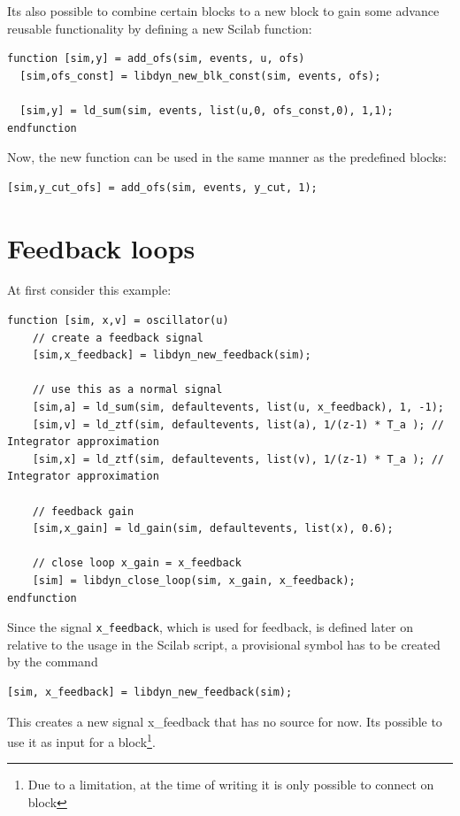 \documentclass[%
	pdftex,%
	a4paper,%
	oneside,%
	11pt,%
	halfparskip,%
	headsepline,%
	bibtotocnumbered,%
	idxtotoc%
]{scrartcl}
\begin{document}
Its also possible to combine certain blocks to a new block to gain some advance reusable functionality by defining a new Scilab function:

\begin{verbatim}
function [sim,y] = add_ofs(sim, events, u, ofs)
  [sim,ofs_const] = libdyn_new_blk_const(sim, events, ofs);
  
  [sim,y] = ld_sum(sim, events, list(u,0, ofs_const,0), 1,1);
endfunction
\end{verbatim}

Now, the new function can be used in the same manner as the predefined blocks:

\begin{verbatim}
[sim,y_cut_ofs] = add_ofs(sim, events, y_cut, 1);
\end{verbatim}

\section{Feedback loops}

At first consider this example:

\begin{verbatim}
function [sim, x,v] = oscillator(u)
    // create a feedback signal
    [sim,x_feedback] = libdyn_new_feedback(sim);

    // use this as a normal signal
    [sim,a] = ld_sum(sim, defaultevents, list(u, x_feedback), 1, -1);
    [sim,v] = ld_ztf(sim, defaultevents, list(a), 1/(z-1) * T_a ); // Integrator approximation
    [sim,x] = ld_ztf(sim, defaultevents, list(v), 1/(z-1) * T_a ); // Integrator approximation  
    
    // feedback gain
    [sim,x_gain] = ld_gain(sim, defaultevents, list(x), 0.6);
    
    // close loop x_gain = x_feedback
    [sim] = libdyn_close_loop(sim, x_gain, x_feedback);
endfunction
\end{verbatim}

Since the signal \texttt{x\_feedback}, which is used for feedback, is defined later on relative to the usage in the Scilab script, a provisional symbol has to be created by the command

\begin{verbatim}
[sim, x_feedback] = libdyn_new_feedback(sim);
\end{verbatim}

This creates a new signal x\_feedback that has no source for now. Its possible to use it as input for a block\footnote{Due to a limitation, at the time of writing it is only possible to connect on block}.
\end{document}
